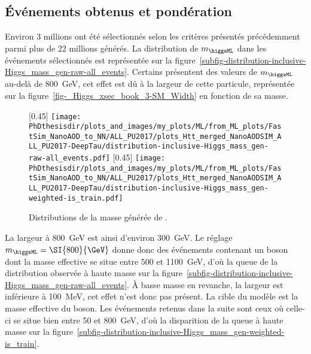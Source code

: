 \subsection{Événements obtenus et pondération}
Environ 3 millions ont été sélectionnés selon les critères présentés précédemment parmi plus de 22 millions générés.
La distribution de $m_{\higgsML}$ dans les événements sélectionnés est représentée sur la figure~\ref{subfig-distribution-inclusive-Higgs_mass_gen-raw-all_events}.
Certains présentent des valeurs de $m_{\higgsML}$ au-delà de \SI{800}{\GeV}, cet effet est dû à la largeur de cette particule,
représentée sur la figure~\ref{fig-_Higgs_xsec_book_3-SM_Width} en fonction de sa masse.
\begin{figure}[h]
\centering

[0.45\textwidth]
{\texttt{[image: \\PhDthesisdir/plots\_and\_images/my\_plots/ML/from\_ML\_plots/FastSim\_NanoAOD\_to\_NN/ALL\_PU2017/plots\_Htt\_merged\_NanoAODSIM\_ALL\_PU2017-DeepTau/distribution-inclusive-Higgs\_mass\_gen-raw-all\_events.pdf]}}
\hfill
{}[0.45\textwidth]
{\texttt{[image: \\PhDthesisdir/plots\_and\_images/my\_plots/ML/from\_ML\_plots/FastSim\_NanoAOD\_to\_NN/ALL\_PU2017/plots\_Htt\_merged\_NanoAODSIM\_ALL\_PU2017-DeepTau/distribution-inclusive-Higgs\_mass\_gen-weighted-is\_train.pdf]}}

\caption[Distributions de la masse générée de \higgsML.]{Distributions de la masse générée de \higgsML.}
\label{fig-distribution-inclusive-Higgs_mass_gen-raw-all_events}
\end{figure}
La largeur à \SI{800}{\GeV} est ainsi d'environ \SI{300}{\GeV}.
Le réglage $m_{\higgsML} = \SI{800}{\GeV}$ donne donc des événements contenant un boson dont la masse effective se situe entre \num{500} et \SI{1100}{\GeV}, d'où la queue de la distribution observée à haute masse sur la figure~\ref{subfig-distribution-inclusive-Higgs_mass_gen-raw-all_events}.
À basse masse en revanche, la largeur est inférieure à \SI{100}{\MeV}, cet effet n'est donc pas présent.
La cible du modèle est la masse effective du boson.
Les événements retenus dans la suite sont ceux où celle-ci se situe bien entre \num{50} et \SI{800}{\GeV},
d'où la disparition de la queue à haute masse sur la figure~\ref{subfig-distribution-inclusive-Higgs_mass_gen-weighted-is_train}.
